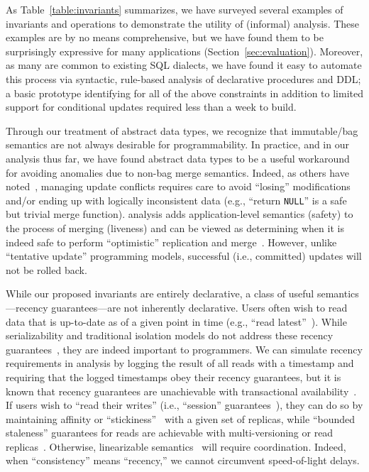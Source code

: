 As Table~\ref{table:invariants} summarizes, we have surveyed several
examples of invariants and operations to demonstrate the utility of
(informal) \iconfluence analysis. These examples are by no means
comprehensive, but we have found them to be surprisingly expressive
for many applications (Section~\ref{sec:evaluation}). Moreover, as
many are common to existing SQL dialects, we have found it easy to
automate this process via syntactic, rule-based analysis of
declarative procedures and DDL; a basic prototype identifying
\iconfluence for all of the above constraints in addition to limited
support for conditional updates required less than a week to build.

Through our treatment of abstract data types, we recognize that
immutable/bag semantics are not always desirable for
programmability. In practice, and in our analysis thus far, we have
found abstract data types to be a useful workaround for avoiding
anomalies due to non-bag merge semantics. Indeed, as others have
noted~\cite{bayou,gray-book}, managing update conflicts requires care
to avoid ``losing'' modifications and/or ending up with logically
inconsistent data (e.g., ``return \texttt{NULL}'' is a safe but
trivial merge function). \iconfluence analysis adds application-level
semantics (safety) to the process of merging (liveness) and can be
viewed as determining when it is indeed safe to perform ``optimistic''
replication and merge~\cite{optimistic}. However, unlike ``tentative
update'' programming models, successful (i.e., committed) updates will
not be rolled back.

While our proposed invariants are entirely declarative, a class of
useful semantics---recency guarantees---are not inherently
declarative. Users often wish to read data that is up-to-date as of a
given point in time (e.g., ``read latest''~\cite{pnuts}). While
serializability and traditional isolation models do not address these
recency guarantees~\cite{adya-isolation}, they are indeed important to
programmers. We can simulate recency requirements in \iconfluence
analysis by logging the result of all reads with a timestamp and
requiring that the logged timestamps obey their recency guarantees,
but it is known that recency guarantees are unachievable with
transactional availability~\cite{hat-vldb}. If users wish to ``read
their writes'' (i.e., ``session'' guarantees~\cite{bayou}), they can
do so by maintaining affinity or
``stickiness''~\cite{hat-vldb,vogels-defs} with a given set of
replicas, while ``bounded staleness'' guarantees for reads are
achievable with multi-versioning or read
replicas~\cite{pnuts}. Otherwise, linearizable
semantics~\cite{spanner} will require coordination. Indeed, when
``consistency'' means ``recency,'' we cannot circumvent speed-of-light
delays.

